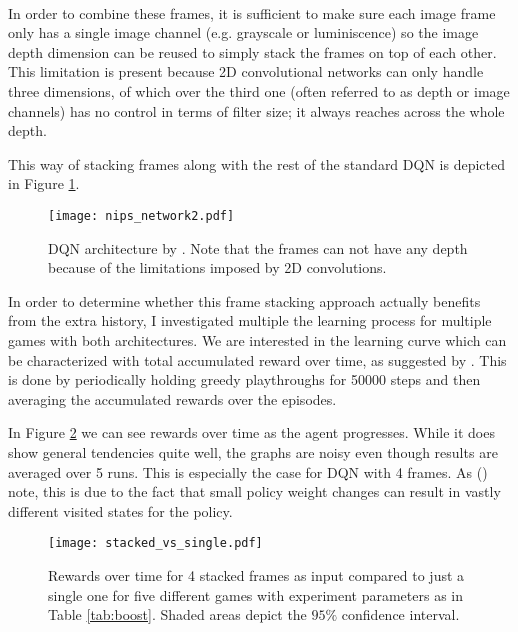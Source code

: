 \paragraph{}
In order to combine these frames,
it is sufficient to make sure each image frame only has a single image channel
(e.g. grayscale or luminiscence)
so the image depth dimension can be reused
to simply stack the frames on top of each other.
This limitation is present because 2D convolutional networks
can only handle three dimensions,
of which over the third one
(often referred to as depth or image channels)
has no control in terms of filter size;
it always reaches across the whole depth.

This way of stacking frames along with the rest of the standard DQN
is depicted in Figure \ref{fig:nips_network2}.

\begin{figure}[htpb]
  \centering
  \texttt{[image: nips\_network2.pdf]}
  \caption[DQN architecture]{
    DQN architecture by \cite{Mnih2013}.
    Note that the frames can not have any depth because of
    the limitations imposed by 2D convolutions.
  }
  \label{fig:nips_network2}
\end{figure}

In order to determine
whether this frame stacking approach
actually benefits from the extra history,
I investigated multiple
the learning process for multiple games
with both architectures.
We are interested in the learning curve
which can be characterized with
total accumulated reward over time,
as suggested by \citeauthor{Bellemare2013} \citeyear{Bellemare2013}.
This is done by periodically
holding greedy playthroughs for 50000 steps
and then averaging the accumulated rewards
over the episodes.

In Figure \ref{fig:stacked_vs_single_rewards}
we can see rewards over time as the agent progresses.
While it does show general tendencies quite well,
the graphs are noisy even though results are averaged over 5 runs.
This is especially the case for DQN with 4 frames.
As \citeauthor{Mnih2013} (\citeyear{Mnih2013}) note,
this is due to the fact that small policy weight changes
can result in vastly different visited states for the policy.

\begin{figure}[htpb]
  \centering
  \texttt{[image: stacked\_vs\_single.pdf]}
  \caption[DQN reward over time]{
    Rewards over time for 4 stacked frames as input
    compared to just a single one
    for five different games
    with experiment parameters as in Table \ref{tab:boost}.
    Shaded areas depict the $95\%$ confidence interval.
  }
  \label{fig:stacked_vs_single_rewards}
\end{figure}

